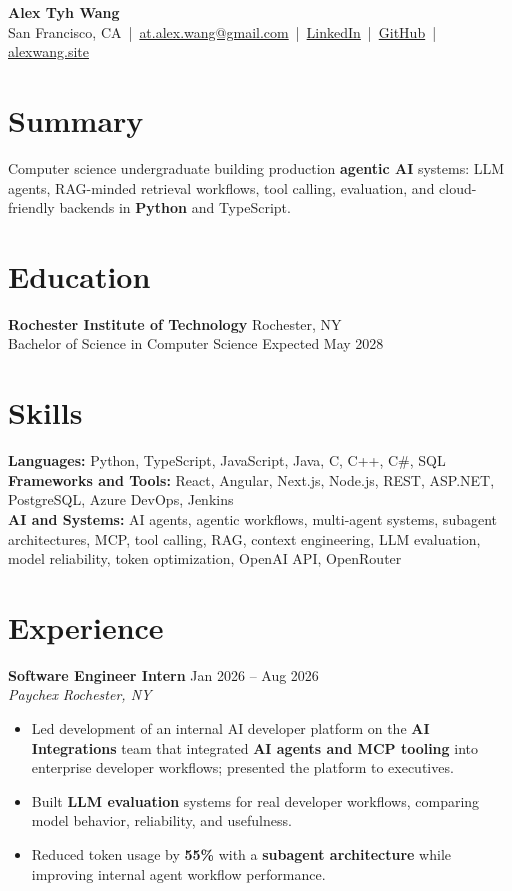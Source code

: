 \documentclass[10pt,letterpaper]{article}
\newif\ifresumeFirstRole
\newcommand{\resumeRole}[4]{%
  \ifresumeFirstRole
    \global\resumeFirstRolefalse
  \else
    \vspace{0pt plus 1fill}%
  \fi
  \textbf{#1} \hfill #2\\
  \textit{#3} \hfill \textit{#4}
}
\begin{document}
\begin{center}
{\Large \textbf{Alex Tyh Wang}}\\
San Francisco, CA \,|\, \href{mailto:at.alex.wang@gmail.com}{at.alex.wang@gmail.com} \,|\, \href{https://www.linkedin.com/in/alex-tyh-wang/}{LinkedIn} \,|\, \href{https://github.com/alextyhwang}{GitHub} \,|\, \href{https://alexwang.site}{alexwang.site}
\end{center}

\section*{Summary}
Computer science undergraduate building production \textbf{agentic AI} systems: LLM agents, RAG-minded retrieval workflows, tool calling, evaluation, and cloud-friendly backends in \textbf{Python} and TypeScript.

\section*{Education}
\textbf{Rochester Institute of Technology} \hfill Rochester, NY\\
Bachelor of Science in Computer Science \hfill Expected May 2028

\section*{Skills}
\textbf{Languages:} Python, TypeScript, JavaScript, Java, C, C++, C\#, SQL\\
\textbf{Frameworks and Tools:} React, Angular, Next.js, Node.js, REST, ASP.NET, PostgreSQL, Azure DevOps, Jenkins\\
\textbf{AI and Systems:} AI agents, agentic workflows, multi-agent systems, subagent architectures, MCP, tool calling, RAG, context engineering, LLM evaluation, model reliability, token optimization, OpenAI API, OpenRouter

\section*{Experience}
\resumeRole{Software Engineer Intern}{Jan 2026 -- Aug 2026}{Paychex}{Rochester, NY}
\begin{itemize}
  \item Led development of an internal AI developer platform on the \textbf{AI Integrations} team that integrated \textbf{AI agents and MCP tooling} into enterprise developer workflows; presented the platform to executives.
  \item Built \textbf{LLM evaluation} systems for real developer workflows, comparing model behavior, reliability, and usefulness.
  \item Reduced token usage by \textbf{55\%} with a \textbf{subagent architecture} while improving internal agent workflow performance.
\end{itemize}
\end{document}
